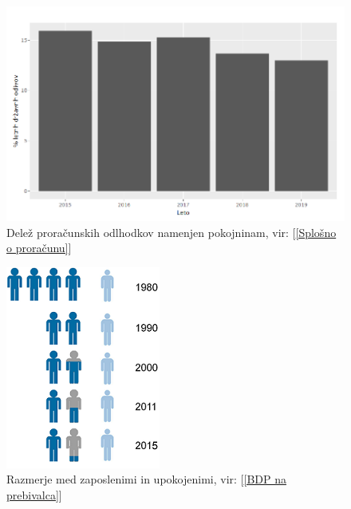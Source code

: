 \documentclass[12pt, a4paper]{article}
\begin{document}
\begin{figure}[h!]
\centering
\includegraphics[width = 13 cm]{pokojnine_procentualno.png}
\caption{Delež proračunskih odlhodkov namenjen pokojninam, vir: [\ref{Splošno o proračunu}]}
\label{Slika 5}
\end{figure}

\begin{figure}[h!]
\centering
\includegraphics[width = 10 cm]{razmerje_med_zaposlenimi_in_upokojenimi_2015.png}
\caption{Razmerje med zaposlenimi in upokojenimi, vir: [\ref{BDP na prebivalca}]}
\label{Slika 6}
\end{figure}
\end{document}
